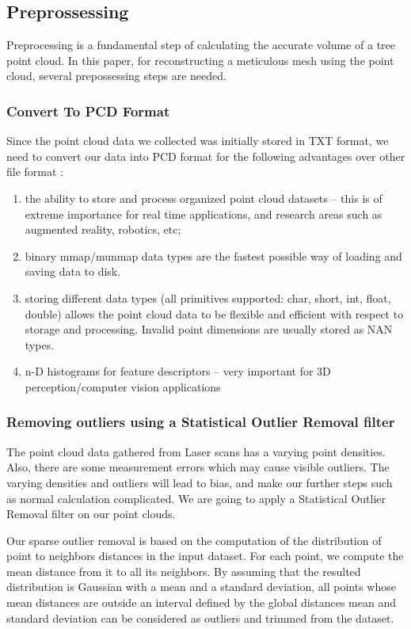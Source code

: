 \documentclass[runningheads,a4paper]{llncs}
\begin{document}
\subsection{Preprossessing}
Preprocessing is a fundamental step of calculating the accurate volume of a tree point cloud. In this paper, for reconstructing a meticulous mesh using the point cloud, several prepossessing steps are needed. 
\subsubsection{Convert To PCD Format}
Since the point cloud data we collected was initially stored in TXT format, we need to convert our data into PCD format for the following advantages over other file format \cite{11}:
\begin{enumerate}
\item the ability to store and process organized point cloud datasets – this is of extreme importance for real time applications, and research areas such as augmented reality, robotics, etc;
\item binary mmap/munmap data types are the fastest possible way of loading and saving data to disk.
\item storing different data types (all primitives supported: char, short, int, float, double) allows the point cloud data to be flexible and efficient with respect to storage and processing. Invalid point dimensions are usually stored as NAN types.
\item n-D histograms for feature descriptors – very important for 3D perception/computer vision applications
\end{enumerate}


\subsubsection{Removing outliers using a Statistical Outlier Removal filter}
The point cloud data gathered from Laser scans has a varying point densities. Also, there are some measurement errors which may cause visible outliers. The varying densities and outliers will lead to bias, and make our further steps such as normal calculation complicated. We are going to apply a Statistical Outlier Removal filter on our point clouds.

Our sparse outlier removal is based on the computation of the distribution of point to neighbors distances in the input dataset. For each point, we compute the mean distance from it to all its neighbors. By assuming that the resulted distribution is Gaussian with a mean and a standard deviation, all points whose mean distances are outside an interval defined by the global distances mean and standard deviation can be considered as outliers and trimmed from the dataset. \cite{12}
\end{document}
